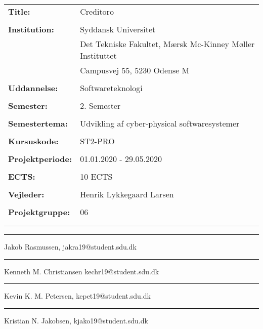 \noindent
\begin{tabular}{@{}l l} 
\textbf{Title:} & Creditoro \\
& \\
\textbf{Institution:} & Syddansk Universitet \\
& Det Tekniske Fakultet, Mærsk Mc-Kinney Møller Instituttet \\
& Campusvej 55, 5230 Odense M \\
& \\
\textbf{Uddannelse:} & Softwareteknologi \\
& \\
\textbf{Semester:} & 2. Semester \\
& \\
\textbf{Semestertema:} & Udvikling af cyber-physical softwaresystemer \\
& \\
\textbf{Kursuskode:} & ST2-PRO \\
& \\
\textbf{Projektperiode:} &  01.01.2020 - 29.05.2020\\
& \\
\textbf{ECTS:} & 10 ECTS\\
& \\
\textbf{Vejleder:} & Henrik Lykkegaard Larsen\\
& \\
\textbf{Projektgruppe:} & 06\\
& \\

\\
\end{tabular}

\par\noindent\rule{\textwidth}{0.4pt}
\noindent
Jakob Rasmussen, jakra19@student.sdu.dk\\
\vspace{3.5mm}

\par\noindent\rule{\textwidth}{0.4pt}
\noindent
Kenneth M. Christiansen kechr19@student.sdu.dk\\
\vspace{3.5mm}

\par\noindent\rule{\textwidth}{0.4pt}
\noindent
Kevin K. M. Petersen, kepet19@student.sdu.dk\\
\vspace{3.5mm}

\par\noindent\rule{\textwidth}{0.4pt}
\noindent
Kristian N. Jakobsen, kjako19@student.sdu.dk\\
\vspace{3.5mm}

